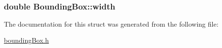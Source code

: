 \hypertarget{structBoundingBox_a47d7ff05e12cf3268a455ee7e11a92f3}{
\subsubsection[{width}]{\setlength{\rightskip}{0pt plus 5cm}double Bounding\-Box\-::width}}\label{structBoundingBox_a47d7ff05e12cf3268a455ee7e11a92f3}


The documentation for this struct was generated from the following file\-:\begin{DoxyCompactItemize}
\item 
\hyperlink{boundingBox_8h}{bounding\-Box.\-h}\end{DoxyCompactItemize}
